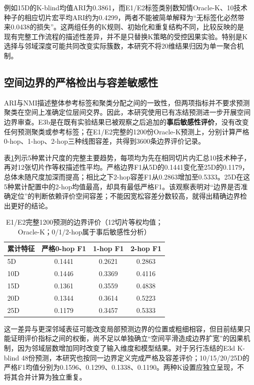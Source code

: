例如15D的K-blind均值ARI为0.3861，而E1/E2标签类别数知情Oracle-K、10技术种子的相应切片宏平均ARI约为0.4299，两者不能被简单解释为“无标签化必然带来0.0438的损失”。这两组任务的K规则、初始化和重复结构不同，比较反映的是现有完整工作流程的描述性差异，并不是只替换K策略的受控因果实验。特别是K选择与邻域深度可能共同改变实际簇数，本研究不将20维结果归因为单一聚合机制。

\subsection{空间边界的严格检出与容差敏感性}
\label{subsec:cellcharter-e3b-v1}

ARI与NMI描述整体参考标签和聚类分配之间的一致性，但两项指标并不要求预测聚类在空间上准确定位层间交界。因此，本研究使用已有冻结预测进一步开展空间边界审查。E3b是在既有实验结果已被观察之后追加的\textbf{事后敏感性评价}，没有改变任何预测聚类或参考标签；在E1/E2完整的1200份Oracle-K预测上，分别计算严格0-hop、1-hop、2-hop三种线图容差，共得到3600条边界评价记录。

表\ref{tab:cellcharter-boundary-v1}列示5种累计尺度的完整主要趋势，每项均为先在相同切片内汇总10技术种子，再对12张切片作等权描述性平均。严格边界F1从5D的0.1441变化至25D的0.1179，总体未随尺度加深而提高；相比之下2-hop容差F1从0.2863增加至0.5333。25D在这5种累计配置中的2-hop均值最高，却具有最低严格F1。该观察表明对“边界是否准确定位”的判断依赖评价空间容差；不能因宽松容差分数较高，就得出精确边界检出更好的结论。

\begin{table}[htbp]
\centering
\caption{E1/E2完整1200预测的边界评价（12切片等权均值；Oracle-K；0/1/2-hop属于事后敏感性分析）}
\label{tab:cellcharter-boundary-v1}
\begin{tabular}{lccc}
\toprule
累计特征 & 严格0-hop F1 & 1-hop F1 & 2-hop F1\\
\midrule
5D & 0.1441 & 0.2621 & 0.2863\\
10D & 0.1446 & 0.3369 & 0.4116\\
15D & 0.1361 & 0.3559 & 0.4838\\
20D & 0.1344 & 0.3614 & 0.5223\\
25D & 0.1179 & 0.3457 & 0.5333\\
\bottomrule
\end{tabular}
\end{table}

这一差异与更深邻域表征可能改变局部预测边界的位置或粗细相容，但目前结果只能证明评价指标之间的权衡，尚不足以单独确立“空间平滑造成边界扩宽”的因果机制，因为邻域层数增加同时改变了输入维度和模型结果。对于另行冻结的E3d K-blind 48份预测，本研究也按同一边界定义完成严格及容差评价；10/15/20/25D的严格F1均值分别为0.1596、0.1299、0.1338、0.1190。两种K设置应独立呈现，不将其合并计算为独立重复。


